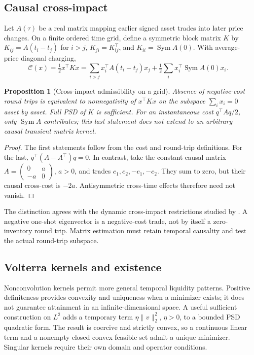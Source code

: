 \documentclass[11pt]{article}
\numberwithin{equation}{section}
\newtheorem{proposition}[theorem]{Proposition}
\theoremstyle{definition}
\theoremstyle{remark}
\theoremstyle{definition}
\begin{document}
\subsection{Causal cross-impact}
Let $A(\tau)$ be a real matrix mapping earlier signed asset trades into later
price changes. On a finite ordered time grid, define a symmetric block matrix
$K$ by $K_{ij}=A(t_i-t_j)$ for $i>j$, $K_{ji}=K_{ij}^{\top}$, and
$K_{ii}=\operatorname{Sym}A(0)$. With average-price diagonal charging,
\[
 \mathcal C(x)=\tfrac12x^\top Kx
 =\sum_{i>j}x_i^\top A(t_i-t_j)x_j+
   \tfrac12\sum_i x_i^\top\operatorname{Sym}A(0)x_i.
\]
\begin{proposition}[Cross-impact admissibility on a grid]\label{prop:cross}
Absence of negative-cost round trips is equivalent to nonnegativity of
$x^\top Kx$ on the subspace $\sum_i x_i=0$ asset by asset. Full PSD of $K$
is sufficient. For an instantaneous cost $q^\top A q/2$, only
$\operatorname{Sym}A$ contributes; this last statement does not extend to
an arbitrary causal transient matrix kernel.
\end{proposition}
\begin{proof}
The first statements follow from the cost and round-trip definitions.
For the last, $q^\top(A-A^\top)q=0$. In contrast, take the constant causal
matrix $A=\left(\begin{smallmatrix}0&a\\-a&0\end{smallmatrix}\right)$,
$a>0$, and trades $e_1,e_2,-e_1,-e_2$. They sum to zero, but their causal
cross-cost is $-2a$. Antisymmetric cross-time effects therefore need not vanish.
\end{proof}
The distinction agrees with the dynamic cross-impact restrictions studied by
\citet{schneider2019}. A negative one-shot eigenvector is a negative-cost
trade, not by itself a zero-inventory round trip. Matrix estimation must retain
temporal causality and test the actual round-trip subspace.

\subsection{Volterra kernels and existence}
Nonconvolution kernels permit more general temporal liquidity patterns.
Positive definiteness provides convexity and uniqueness when a minimizer
exists; it does not guarantee attainment in an infinite-dimensional space.
A useful sufficient construction on $L^2$ adds a temporary term
$\eta\|v\|_2^2$, $\eta>0$, to a bounded PSD quadratic form. The result is
coercive and strictly convex, so a continuous linear term and a nonempty
closed convex feasible set admit a unique minimizer. Singular kernels require
their own domain and operator conditions.
\end{document}
